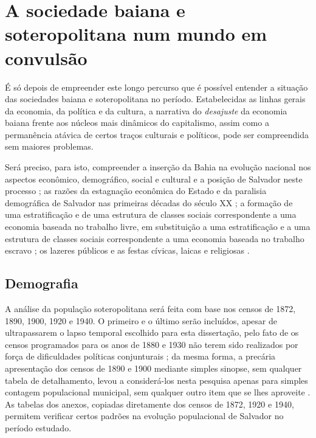 \section{A sociedade baiana e soteropolitana num mundo em convulsão}\label{sec:sobasotconv}

É só depois de empreender este longo percurso que é possível entender a situação das sociedades baiana e soteropolitana no período. Estabelecidas as linhas gerais da economia, da política e da cultura, a narrativa do \textit{desajuste} da economia baiana frente aos núcleos mais dinâmicos do capitalismo, assim como a permanência atávica de certos traços culturais e políticos, pode ser compreendida sem maiores problemas.

Será preciso, para isto, compreender a inserção da Bahia na evolução nacional nos aspectos econômico, demográfico, social e cultural e a posição de Salvador neste processo \cite{CPE1980}; as razões da estagnação econômica do Estado e da paralisia demográfica de Salvador nas primeiras décadas do século XX \cite{AGUIAR1958, CUNHA2011, santos_repovo_2001, VASCONCELOS2002}; a formação de uma estratificação e de uma estrutura de classes sociais correspondente a uma economia baseada no trabalho livre, em substituição a uma estratificação e a uma estrutura de classes sociais correspondente a uma economia baseada no trabalho escravo \cite{aguiar_hierarquias_1974, batalha_classe_1998, fraga_encruzilhadas_2014, MATTOS2008, santos_repovo_2001, souza_trabalholivre_2011, velho_classes_1977}; os lazeres públicos e as festas cívicas, laicas e religiosas \cite{VASCONCELOS2002}.

\subsection{Demografia}\label{subsec:demogbasa}

A análise da população soteropolitana será feita com base nos censos de 1872, 1890, 1900, 1920 e 1940. O primeiro e o último serão incluídos, apesar de ultrapassarem o lapso temporal escolhido para esta dissertação, pelo fato de os censos programados para os anos de 1880 e 1930 não terem sido realizados por força de dificuldades políticas conjunturais \cite{oliveirasimoes_censos_2005}; da mesma forma, a precária apresentação dos censos de 1890 e 1900 mediante simples sinopse, sem qualquer tabela de detalhamento, levou a considerá-los nesta pesquisa apenas para simples contagem populacional municipal, sem qualquer outro item que se lhes aproveite \cite{reisetal_areascensos_2011}. As tabelas dos anexos, copiadas diretamente dos censos de 1872, 1920 e 1940, permitem verificar certos padrões na evolução populacional de Salvador no período estudado.

